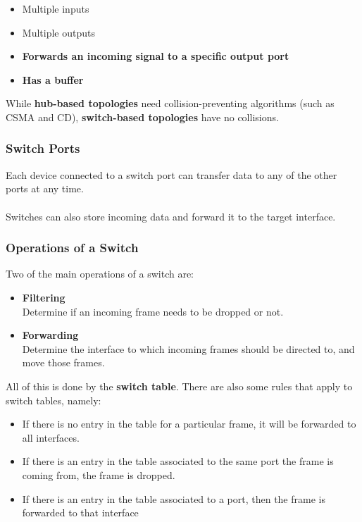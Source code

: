\documentclass{article}
\begin{document}
\begin{itemize}
	\item Multiple inputs
	\item Multiple outputs
	\item \textbf{Forwards an incoming signal to a specific output port}
	\item \textbf{Has a buffer}
\end{itemize}
While \textbf{hub-based topologies} need collision-preventing algorithms (such as CSMA and CD), \textbf{switch-based topologies} have no collisions.

\subsubsection{Switch Ports}
Each device connected to a switch port can transfer data to any of the other ports at any time. \\ \\
Switches can also store incoming data and forward it to the target interface.

\subsubsection{Operations of a Switch}
Two of the main operations of a switch are:

\begin{itemize}
	\item \textbf{Filtering}
	\vspace{.2cm} \\
	Determine if an incoming frame needs to be dropped or not.
	
	\item \textbf{Forwarding}
	\vspace{.2cm} \\
	Determine the interface to which incoming frames should be directed to, and move those frames.
\end{itemize}
All of this is done by the \textbf{switch table}. There are also some rules that apply to switch tables, namely:

\begin{itemize}
	\item If there is no entry in the table for a particular frame, it will be forwarded to all interfaces.
	\item If there is an entry in the table associated to the same port the frame is coming from, the frame is dropped.
	\item If there is an entry in the table associated to a port, then the frame is forwarded to that interface
\end{itemize}
\end{document}
